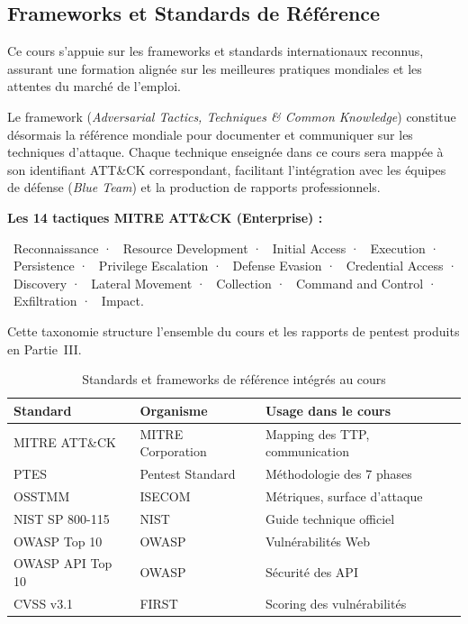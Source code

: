 \subsection*{Frameworks et Standards de Référence}

Ce cours s'appuie sur les frameworks et standards internationaux reconnus, assurant
une formation alignée sur les meilleures pratiques mondiales et les attentes du marché
de l'emploi.

Le framework  (\textit{Adversarial Tactics, Techniques \&
Common Knowledge}) constitue désormais la référence mondiale pour documenter et
communiquer sur les techniques d'attaque. Chaque technique enseignée dans ce cours
sera mappée à son identifiant ATT\&CK correspondant, facilitant l'intégration avec
les équipes de défense (\textit{Blue Team}) et la production de rapports
professionnels.

\begin{boxinfo}
\textbf{Les 14 tactiques MITRE ATT\&CK (Enterprise) :}

\smallskip
{}~Reconnaissance · ~Resource Development ·
~Initial Access · ~Execution ·
~Persistence · ~Privilege Escalation ·
~Defense Evasion · ~Credential Access ·
~Discovery · ~Lateral Movement ·
~Collection · ~Command and Control ·
~Exfiltration · ~Impact.

\smallskip
\noindent Cette taxonomie structure l'ensemble du cours et les rapports de pentest
produits en Partie~III.
\end{boxinfo}

\begin{table}[htbp]
\centering
\caption{Standards et frameworks de référence intégrés au cours}
\label{tab:standards}
\begin{tabular}{lll}
\toprule
\textbf{Standard} & \textbf{Organisme} & \textbf{Usage dans le cours} \\
\midrule
MITRE ATT\&CK  & MITRE Corporation & Mapping des TTP, communication \\
PTES           & Pentest Standard  & Méthodologie des 7 phases \\
OSSTMM         & ISECOM            & Métriques, surface d'attaque \\
NIST SP 800-115 & NIST             & Guide technique officiel \\
OWASP Top 10   & OWASP             & Vulnérabilités Web \\
OWASP API Top 10 & OWASP           & Sécurité des API \\
CVSS v3.1      & FIRST             & Scoring des vulnérabilités \\
\bottomrule
\end{tabular}
\end{table}


